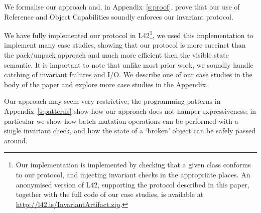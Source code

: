 We formalise our approach and, in Appendix~\ref{s:proof}, prove that our use of Reference and Object Capabilities soundly enforces our invariant protocol.

We have fully implemented our protocol in L42\footnote{
Our implementation is implemented by checking that a given class conforms to our protocol, and injecting invariant checks in the appropriate places.
An anonymised version of L42, supporting the protocol described in this paper, together with the full code of our case studies, is available at \url{http://l42.is/InvariantArtifact.zip}. %
}, we used this implementation to implement many case studies, showing that our protocol is more succinct than the pack/unpack approach and much more efficient then the visible state semantic.
It is important to note that unlike most prior work, we soundly handle catching of invariant failures and I/O.
We describe one of our case studies in the body of the paper and explore more case studies in the Appendix.

Our approach may seem very restrictive;
the programming patterns in Appendix~\ref{s:patterns} show how our approach does not hamper expressiveness; in particular we show how batch mutation operations can be performed with a single invariant check, and how the state of a `broken' object can be safely passed around.


